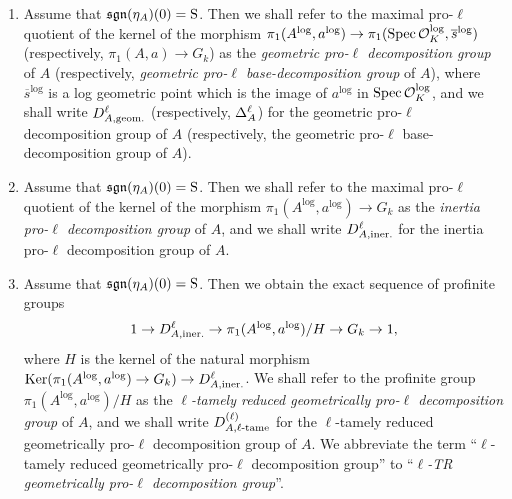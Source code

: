 \begin{defn}
\begin{enumerate}
\[    \]
    (respectively, the exact sequence of profinite groups
    \[
      1 \to \IPRBDG{\ell}{A} \to \pi_1(A, a)/H \to G_k \to 1,)
    \]
    where $H$ is the kernel of the natural morphism $\Ker(\pi_1(A^\log, a^\log) \to G_k) \to \IPRDG{\ell}{A}$ (respectively, $\Ker(\pi_1(A, a) \to G_k) \to \IPRBDG{\ell}{A}$). Then we shall refer to the profinite group $\pi_1(A^\log, a^\log)/H$ (respectively, $\pi_1(A, a)/H$) arising from the diagram as the \emph{$\ell$-tamely reduced geometrically pro-$\ell$ decomposition group} of $A$ (respectively, \emph{$\ell$-tamely reduced geometrically pro-$\ell$ base-decomposition group} of $A$), and we shall write $\lTRGPRDG{\ell}{A}$ (respectively, $\lTRGPRBDG{\ell}{A}$) for the $\ell$-tamely reduced geometrically pro-$\ell$ decomposition group of $A$. We abbreviate the term ``$\ell$-tamely reduced geometrically pro-$\ell$ decomposition group'' (respectively, ``$\ell$-tamely reduced geometrically pro-$\ell$ base-decomposition group'') to ``\emph{$\ell$-TR geometrically pro-$\ell$ decomposition group}'' (respectively, ``\emph{$\ell$-TR geometrically pro-$\ell$ base-decomposition group}'').
    \item Assume that $\mathfrak{sgn}(\eta_A)(0) = \mathrm{S}$. Then we shall refer to the maximal pro-$\ell$ quotient of the kernel of the morphism $\pi_1(A^{\mathrm{log}}, a^{\mathrm{log}}) \to \pi_1(\mathrm{Spec}\, \mathcal{O}_K^{\mathrm{log}}, \overline{s}^{\mathrm{log}})$ (respectively, $\pi_1(A, a) \to G_k$) as the \emph{geometric pro-$\ell$ decomposition group} of $A$ (respectively, \emph{geometric pro-$\ell$ base-decomposition group} of $A$), where $\overline{s}^\log$ is a log geometric point which is the image of $a^\log$ in $\mathrm{Spec} \, \mathcal{O}_K^{\mathrm{log}}$, and we shall write $D^{\ell}_{A, \text{geom.}}$ (respectively, $\Delta_{A}^{\ell}$) for the geometric pro-$\ell$ decomposition group of $A$ (respectively, the geometric pro-$\ell$ base-decomposition group of $A$).
    \item Assume that $\mathfrak{sgn}(\eta_A)(0) = \mathrm{S}$. Then we shall refer to the maximal pro-$\ell$ quotient of the kernel of the morphism $\pi_1(A^\log, a^\log) \to G_k$ as the \emph{inertia pro-$\ell$ decomposition group} of $A$, and we shall write $D^{\ell}_{A, \text{iner.}}$ for the inertia pro-$\ell$ decomposition group of $A$.
    \item Assume that $\mathfrak{sgn}(\eta_A)(0) = \mathrm{S}$. Then we obtain the exact sequence of profinite groups
    \[
      1 \to D^{\ell}_{A, \text{iner.}} \to \pi_1(A^{\mathrm{log}}, a^{\mathrm{log}})/H \to G_k \to 1,
    \]
    where $H$ is the kernel of the natural morphism $\Ker(\pi_1(A^\log, a^\log) \to G_k) \to \IPRDG{\ell}{A}$. We shall refer to the profinite group $\pi_1(A^\log, a^\log)/H$ as the \emph{$\ell$-tamely reduced geometrically pro-$\ell$ decomposition group} of $A$, and we shall write $\lTRGPRDG{\ell}{A}$ for the $\ell$-tamely reduced geometrically pro-$\ell$ decomposition group of $A$. We abbreviate the term ``$\ell$-tamely reduced geometrically pro-$\ell$ decomposition group'' to ``\emph{$\ell$-TR geometrically pro-$\ell$ decomposition group}''.

\end{enumerate}
\end{defn}
